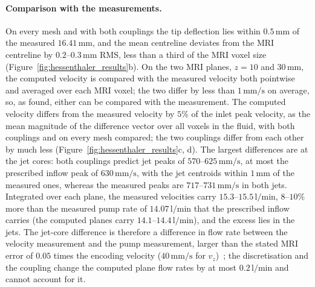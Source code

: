 \paragraph{Comparison with the measurements.}
On every mesh and with both couplings the tip deflection lies within $0.5\,\mathrm{mm}$ of the measured $16.41\,\mathrm{mm}$, and the mean centreline deviates from the MRI centreline by $0.2$--$0.3\,\mathrm{mm}$ RMS, less than a third of the MRI voxel size (Figure~\ref{fig:hessenthaler_results}b).
On the two MRI planes, $z = 10$ and $30\,\mathrm{mm}$, the computed velocity is compared with the measured velocity both pointwise and averaged over each MRI voxel; the two differ by less than $1\,\mathrm{mm/s}$ on average, so, as \citet{Hessenthaler2017a} found, either can be compared with the measurement.
The computed velocity differs from the measured velocity by $5\%$ of the inlet peak velocity, as the mean magnitude of the difference vector over all voxels in the fluid, with both couplings and on every mesh compared; the two couplings differ from each other by much less (Figure~\ref{fig:hessenthaler_results}c, d).
The largest differences are at the jet cores: both couplings predict jet peaks of $570$--$625\,\mathrm{mm/s}$, at most the prescribed inflow peak of $630\,\mathrm{mm/s}$, with the jet centroids within $1\,\mathrm{mm}$ of the measured ones, whereas the measured peaks are $717$--$731\,\mathrm{mm/s}$ in both jets.
Integrated over each plane, the measured velocities carry $15.3$--$15.5\,\mathrm{l/min}$, $8$--$10\%$ more than the measured pump rate of $14.07\,\mathrm{l/min}$ that the prescribed inflow carries (the computed planes carry $14.1$--$14.4\,\mathrm{l/min}$), and the excess lies in the jets.
The jet-core difference is therefore a difference in flow rate between the velocity measurement and the pump measurement, larger than the stated MRI error of $0.05$ times the encoding velocity ($40\,\mathrm{mm/s}$ for $v_z$)~\citep{Hessenthaler2017a}; the discretisation and the coupling change the computed plane flow rates by at most $0.2\,\mathrm{l/min}$ and cannot account for it.

